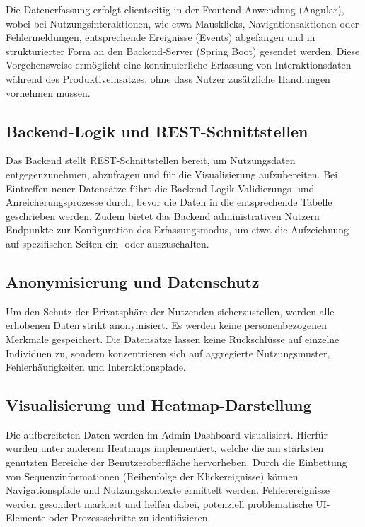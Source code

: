 \documentclass[12pt,oneside]{article}
\begin{document}
Die Datenerfassung erfolgt clientseitig in der Frontend-Anwendung (Angular), wobei bei Nutzungsinteraktionen, wie etwa Mausklicks, Navigationsaktionen oder Fehlermeldungen, entsprechende Ereignisse (Events) abgefangen und in strukturierter Form an den Backend-Server (Spring Boot) gesendet werden. Diese Vorgehensweise ermöglicht eine kontinuierliche Erfassung von Interaktionsdaten während des Produktiveinsatzes, ohne dass Nutzer zusätzliche Handlungen vornehmen müssen.

 
\subsection{Backend-Logik und REST-Schnittstellen}

Das Backend stellt REST-Schnittstellen bereit, um Nutzungsdaten entgegenzunehmen, abzufragen und für die Visualisierung aufzubereiten. Bei Eintreffen neuer Datensätze führt die Backend-Logik Validierungs- und Anreicherungsprozesse durch, bevor die Daten in die entsprechende Tabelle geschrieben werden. Zudem bietet das Backend administrativen Nutzern Endpunkte zur Konfiguration des Erfassungsmodus, um etwa die Aufzeichnung auf spezifischen Seiten ein- oder auszuschalten.

\subsection{Anonymisierung und Datenschutz}

Um den Schutz der Privatsphäre der Nutzenden sicherzustellen, werden alle erhobenen Daten strikt anonymisiert. Es werden keine personenbezogenen Merkmale gespeichert. Die Datensätze lassen keine Rückschlüsse auf einzelne Individuen zu, sondern konzentrieren sich auf aggregierte Nutzungsmuster, Fehlerhäufigkeiten und Interaktionspfade.

\subsection{Visualisierung und Heatmap-Darstellung}

Die aufbereiteten Daten werden im Admin-Dashboard visualisiert. Hierfür wurden unter anderem Heatmaps implementiert, welche die am stärksten genutzten Bereiche der Benutzeroberfläche hervorheben. Durch die Einbettung von Sequenzinformationen (Reihenfolge der Klickereignisse) können Navigationspfade und Nutzungskontexte ermittelt werden. Fehlerereignisse werden gesondert markiert und helfen dabei, potenziell problematische UI-Elemente oder Prozessschritte zu identifizieren.
\end{document}
